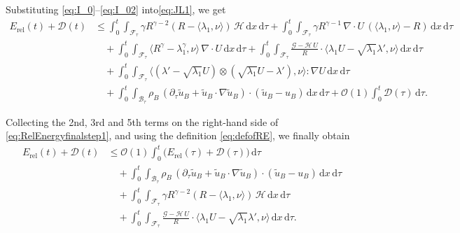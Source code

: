 \documentclass[11pt,twoside,reqno]{amsart}
\numberwithin{equation}{section}
\numberwithin{figure}{section}
\begin{document}
Substituting \eqref{eq:I_0}–\eqref{eq:I_02} into\eqref{eq:JL1}, we get
\begin{equation}\label{eq:RelEnergyfinalstep1}
\begin{aligned}
E_{\mathrm{rel}}(t)+\mathcal{D}(t)
&\le \int_0^t\!\!\int_{\mathcal{F}_\tau}\gamma R^{\gamma-2}(R-\langle\lambda_1,\nu\rangle)\,\mathcal{H}\,\mathrm{d}x\,\mathrm{d}\tau
  +\int_0^t\!\!\int_{\mathcal{F}_\tau}\gamma R^{\gamma-1}\,\nabla\!\cdot U\,(\langle\lambda_1,\nu\rangle-R)\,\mathrm{d}x\,\mathrm{d}\tau\\
&\quad+\int_0^t\!\!\int_{\mathcal{F}_\tau}\big\langle R^\gamma-\lambda_1^\gamma,\nu\big\rangle\,\nabla\!\cdot U\,\mathrm{d}x\,\mathrm{d}\tau
  +\int_0^t\!\!\int_{\mathcal{F}_\tau}\frac{\mathcal{G}-\mathcal{H}\,U}{R}\cdot\big\langle \lambda_1U-\sqrt{\lambda_1}\lambda',\nu\big\rangle\,\mathrm{d}x\,\mathrm{d}\tau\\
&\quad+\int_0^t\!\!\int_{\mathcal{F}_\tau}\big\langle (\lambda'-\sqrt{\lambda_1}U)\otimes(\sqrt{\lambda_1}U-\lambda'),\nu\big\rangle\!:\!\nabla U\,\mathrm{d}x\,\mathrm{d}\tau\\
&\quad+\int_0^t\!\!\int_{\mathcal{B}_\tau}\rho_B\,(\partial_\tau \tilde u_B + \tilde u_B\cdot\nabla\tilde u_B)\cdot(\tilde u_B-u_B)\,\mathrm{d}x\,\mathrm{d}\tau
+\mathcal{O}(1)\int_0^t\mathcal{D}(\tau)\,\mathrm{d}\tau.
\end{aligned}
\end{equation}

Collecting the 2nd, 3rd and 5th terms on the right-hand side of \eqref{eq:RelEnergyfinalstep1}, and using the definition \eqref{eq:defofRE}, we finally obtain
\begin{equation}\label{eq:simplifiedErelEst}
\begin{aligned}
E_{\mathrm{rel}}(t)+\mathcal{D}(t)
&\le \mathcal{O}(1)\int_0^t\big(E_{\mathrm{rel}}(\tau)+\mathcal{D}(\tau)\big)\,\mathrm{d}\tau\\
&\quad+\int_0^t\!\!\int_{\mathcal{B}_\tau}\rho_B\,(\partial_\tau \tilde u_B + \tilde u_B\cdot\nabla\tilde u_B)\cdot(\tilde u_B-u_B)\,\mathrm{d}x\,\mathrm{d}\tau\\
&\quad+\int_0^t\!\!\int_{\mathcal{F}_\tau}\gamma R^{\gamma-2}(R-\langle\lambda_1,\nu\rangle)\,\mathcal{H}\,\mathrm{d}x\,\mathrm{d}\tau
\\&\quad+\int_0^t\!\!\int_{\mathcal{F}_\tau}\frac{\mathcal{G}-\mathcal{H}\,U}{R}\cdot\big\langle \lambda_1U-\sqrt{\lambda_1}\lambda',\nu\big\rangle\,\mathrm{d}x\,\mathrm{d}\tau.
\end{aligned}
\end{equation}
\end{document}

